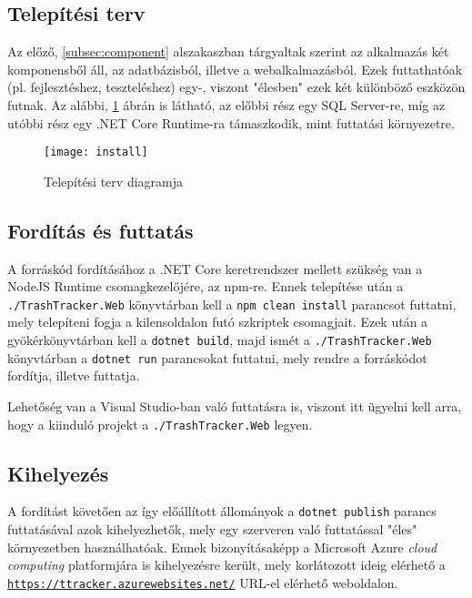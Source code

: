 \subsection{Telepítési terv}

Az előző, \ref{subsec:component} alszakaszban tárgyaltak szerint az alkalmazás két komponensből áll, az adatbázisból, illetve a webalkalmazásból. Ezek futtathatóak (pl. fejlesztéshez, teszteléshez) egy-, viszont "élesben" ezek két különböző eszközön futnak. Az alábbi, \ref{fig:install} ábrán  is látható, az előbbi rész egy SQL Server-re, míg az utóbbi rész egy .NET Core Runtime-ra támaszkodik, mint futtatási környezetre.

\begin{figure}[H]
	\centering
	\texttt{[image: install]}
	\caption{Telepítési terv diagramja}
	\label{fig:install}
\end{figure}

\subsection{Fordítás és futtatás}

A forráskód fordításához a .NET Core keretrendszer mellett szükség van a NodeJS Runtime csomagkezelőjére, az npm-re. Ennek telepítése után a \texttt{./TrashTracker.Web} könyvtárban kell a \texttt{npm clean install} parancsot futtatni, mely telepíteni fogja a kilensoldalon futó szkriptek csomagjait. Ezek után a gyökérkönyvtárban kell a \texttt{dotnet build}, majd ismét a \texttt{./TrashTracker.Web} könyvtárban a \texttt{dotnet run} parancsokat futtatni, mely rendre a forráskódot fordítja, illetve futtatja.
\begin{note}
	Lehetőség van a Visual Studio-ban való futtatásra is, viszont itt ügyelni kell arra, hogy a kiinduló projekt a \texttt{./TrashTracker.Web} legyen.
\end{note}

\subsection{Kihelyezés}

A fordítást követően az így előállított állományok a \texttt{dotnet publish} parancs futtatásával azok kihelyezhetők, mely egy szerveren való futtatással "éles" környezetben használhatóak. Ennek bizonyításaképp a Microsoft Azure \textit{cloud computing} platformjára is kihelyezésre került, mely korlátozott ideig elérhető a \texttt{\url{https://ttracker.azurewebsites.net/}} URL-el elérhető weboldalon.

